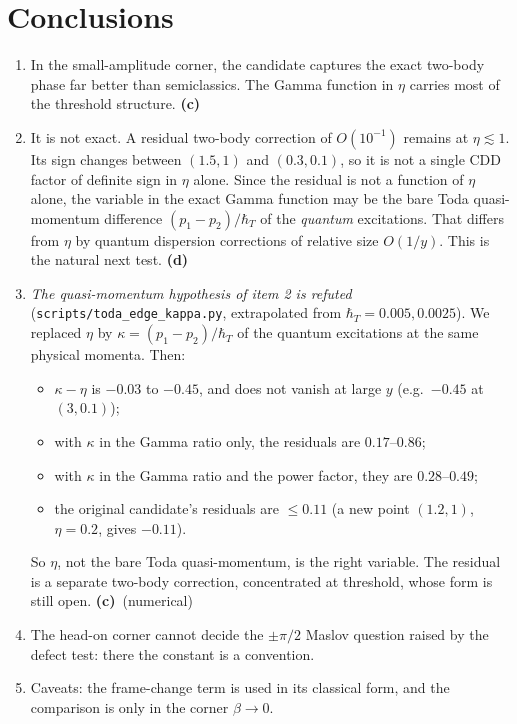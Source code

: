 \documentclass[11pt,a4paper]{article}
\newcommand{\Lc}{\textsf{\textbf{(c)}}}\newcommand{\Ld}{\textsf{\textbf{(d)}}}
\newcommand{\script}[1]{\texttt{scripts/#1}}
\begin{document}
\section{Conclusions}
\begin{enumerate}
\item In the small-amplitude corner, the candidate captures the exact two-body phase far better than semiclassics. The Gamma function in $\eta$ carries most of the threshold structure. \Lc
\item It is not exact. A residual two-body correction of $O(10^{-1})$ remains at $\eta\lesssim1$. Its sign changes between $(1.5,1)$ and $(0.3,0.1)$, so it is not a single CDD factor of definite sign in $\eta$ alone. Since the residual is not a function of $\eta$ alone, the variable in the exact Gamma function may be the bare Toda quasi-momentum difference $(p_1-p_2)/\hbar_T$ of the \emph{quantum} excitations. That differs from $\eta$ by quantum dispersion corrections of relative size $O(1/y)$. This is the natural next test. \Ld
\item \emph{The quasi-momentum hypothesis of item 2 is refuted} (\script{toda\_edge\_kappa.py}, extrapolated from $\hbar_T=0.005,0.0025$). We replaced $\eta$ by $\kappa=(p_1-p_2)/\hbar_T$ of the quantum excitations at the same physical momenta. Then:
  \begin{itemize}
  \item $\kappa-\eta$ is $-0.03$ to $-0.45$, and does not vanish at large $y$ (e.g.\ $-0.45$ at $(3,0.1)$);
  \item with $\kappa$ in the Gamma ratio only, the residuals are $0.17$--$0.86$;
  \item with $\kappa$ in the Gamma ratio and the power factor, they are $0.28$--$0.49$;
  \item the original candidate's residuals are $\le0.11$ (a new point $(1.2,1)$, $\eta=0.2$, gives $-0.11$).
  \end{itemize}
  So $\eta$, not the bare Toda quasi-momentum, is the right variable. The residual is a separate two-body correction, concentrated at threshold, whose form is still open. \Lc\ (numerical)
\item The head-on corner cannot decide the $\pm\pi/2$ Maslov question raised by the defect test: there the constant is a convention.
\item Caveats: the frame-change term is used in its classical form, and the comparison is only in the corner $\beta\to0$.
\end{enumerate}
\end{document}
